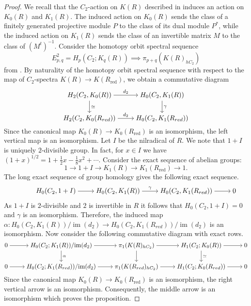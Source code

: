 \documentclass[11pt,a4paper]{amsart}
\theoremstyle{plain}
\theoremstyle{definition}
\theoremstyle{remark}
\begin{document}
\begin{proof}
We recall that the $C_2$-action on $K(R)$ described in \cite[Section 7]{schlichting2017hermitian} induces an action on $K_0(R)$ and $K_1(R)$. The induced action on $K_0(R)$ sends the class of a finitely generated projective module $P$ to the class of its dual module $P^*$, while the induced action on $K_1(R)$ sends the class of an invertible matrix $M$ to the class of $(M^t)^{-1}$.
Consider the homotopy orbit spectral sequence
$$E^2_{p,q} = H_p(C_2; K_q(R)) \implies \pi_{p+q}(K(R)_{hC_2})
$$ 
from \cite[Proposition B.2]{schlichting2017hermitian}. 
By naturality of the homotopy orbit spectral sequence with respect to the map of $C_2$-spectra 
$K(R)\longrightarrow K(R_{\mathrm{red}})$, 
we obtain a commutative diagram
\[\begin{tikzcd}[ampersand replacement=\&,cramped]
	{H_2(C_2, K_0(R))} \& {H_0(C_2, K_1(R))} \\
	{H_2(C_2, K_0(R_{red}))} \& {H_0(C_2, K_1(R_{red}))}
	\arrow["{d_2}", from=1-1, to=1-2]
	\arrow["\simeq", from=1-1, to=2-1]
	\arrow["\gamma", from=1-2, to=2-2]
	\arrow["{d_2}", from=2-1, to=2-2]
\end{tikzcd}\]
Since the canonical map $K_0(R) \rightarrow K_0(R_{\mathrm{red}})$ is an isomorphism, the left vertical map is an isomorphism.
Let $I$ be the nilradical of $R$. We note that $1+I$ is uniquely $2$-divisible group.  In fact, for $x\in I$ we have $(1+x)^{1/2}=1+\frac{1}{2}x-\frac{1}{8}x^2+\cdots$.
Consider the exact sequence of abelian groups:
\[
1 \longrightarrow 1+I \longrightarrow K_1(R) \longrightarrow K_1(R_{\text{red}}) \longrightarrow 1.
\]
The long exact sequence of group homology gives the following exact sequence.
\[\begin{tikzcd}[ampersand replacement=\&,cramped]
	{} \& {H_0(C_2,1+I)} \& {H_0(C_2,K_1(R))} \& {H_0(C_2,K_1(R_{red}))} \& 0
	\arrow[from=1-2, to=1-3]
	\arrow["\gamma", from=1-3, to=1-4]
	\arrow[from=1-4, to=1-5]
\end{tikzcd}\]
As $1+I$ is $2$-divisible and $2$ is invertible in $R$ it follows that $H_0(C_2, 1+I)=0$ and $\gamma$ is an isomorphism. Therefore, the induced map
$\alpha: H_0(C_2,K_1(R))/\operatorname{im}(d_2)
\rightarrow
H_0(C_2,K_1(R_{red}))/\operatorname{im}(d_2)$
is an isomorphism. Now consider the following commutative diagram with exact rows.
\[\begin{tikzcd}[ampersand replacement=\&,cramped]
	0 \& {H_0(C_2; K_1(R))/\text{im}(d_2)} \& {\pi_1 (K(R)_{hC_2})} \& { H_1(C_2;K_0(R))} \& 0 \\
	0 \& {H_0(C_2; K_1(R_{red}))/\text{im}(d_2)} \& {\pi_1 (K(R_{red})_{hC_2})} \& { H_1(C_2;K_0(R_{red}))} \& 0
	\arrow[from=1-1, to=1-2]
	\arrow[from=1-2, to=1-3]
	\arrow["\alpha", from=1-2, to=2-2]
	\arrow[from=1-3, to=1-4]
	\arrow[from=1-3, to=2-3]
	\arrow[from=1-4, to=1-5]
	\arrow["\simeq", from=1-4, to=2-4]
	\arrow[from=2-1, to=2-2]
	\arrow[from=2-2, to=2-3]
	\arrow[from=2-3, to=2-4]
	\arrow[from=2-4, to=2-5]
\end{tikzcd}\]
Since the canonical map $K_0(R) \rightarrow K_0(R_{\mathrm{red}})$ is an isomorphism, the right vertical arrow is an isomorphism. Consequently, the middle arrow is an isomorphism which proves the proposition.
\end{proof}
\end{document}
